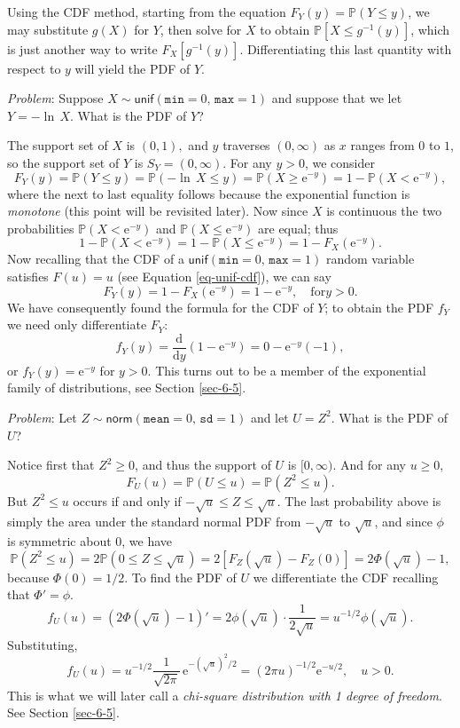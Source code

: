 Using the CDF method, starting from the equation
\(F_{Y}(y)=\mathbb{P}(Y\leq y)\), we may substitute \(g(X)\) for
\(Y\), then solve for \(X\) to obtain \(\mathbb{P}[X\leq g^{-1}(y)]\),
which is just another way to write
\(F_{X}[g^{-1}(y)]\). Differentiating this last quantity with respect
to \(y\) will yield the PDF of \(Y\).


\emph{Problem}:
Suppose \(X\sim\mathsf{unif}(\mathtt{min}=0,\,\mathtt{max}=1)\) and
suppose that we let \(Y=-\ln\, X\). What is the PDF of \(Y\)?

The support set of \(X\) is \((0,1),\) and \(y\) traverses
\((0,\infty)\) as \(x\) ranges from \(0\) to \(1\), so the support set
of \(Y\) is \(S_{Y}=(0,\infty)\). For any \(y>0\), we consider \[
F_{Y}(y)=\mathbb{P}(Y\leq y)=\mathbb{P}(-\ln\, X\leq
y)=\mathbb{P}(X\geq\mathrm{e}^{-y})=1-\mathbb{P}(X<\mathrm{e}^{-y}),
\] where the next to last equality follows because the exponential
function is \emph{monotone} (this point will be revisited later). Now since
\(X\) is continuous the two probabilities
\(\mathbb{P}(X<\mathrm{e}^{-y})\) and
\(\mathbb{P}(X\leq\mathrm{e}^{-y})\) are equal; thus \[ 1-\mathbb{P}(X
<
\mathrm{e}^{-y})=1-\mathbb{P}(X\leq\mathrm{e}^{-y})=1-F_{X}(\mathrm{e}^{-y}).
\] Now recalling that the CDF of a
\(\mathsf{unif}(\mathtt{min}=0,\,\mathtt{max}=1)\) random variable
satisfies \(F(u)=u\) (see Equation \eqref{eq-unif-cdf}), we can say \[
F_{Y}(y)=1-F_{X}(\mathrm{e}^{-y})=1-\mathrm{e}^{-y},\quad \mbox{for
}y>0.  \] We have consequently found the formula for the CDF of \(Y\);
to obtain the PDF \(f_{Y}\) we need only differentiate \(F_{Y}\): \[
f_{Y}(y)=\frac{\mathrm{d}}{\mathrm{d}
y}\left(1-\mathrm{e}^{-y}\right)=0-\mathrm{e}^{-y}(-1), \] or
\(f_{Y}(y)=\mathrm{e}^{-y}\) for \(y>0\). This turns out to be a
member of the exponential family of distributions, see Section
\ref{sec-6-5}.

\emph{Problem}:
\label{exa-distn-of-z-squared} Let
\(Z\sim\mathsf{norm}(\mathtt{mean}=0,\,\mathtt{sd}=1)\) and let
\(U=Z^{2}\).
What is the PDF of \(U\)?

Notice first that
\(Z^{2}\geq0\), and thus the support of \(U\) is \([0,\infty)\). And
for any \(u\geq0\), \[ F_{U}(u)=\mathbb{P}(U\leq
u)=\mathbb{P}(Z^{2}\leq u).  \] But \(Z^{2}\leq u\) occurs if and only
if \(-\sqrt{u}\leq Z\leq\sqrt{u}\). The last probability above is
simply the area under the standard normal PDF from \(-\sqrt{u}\) to
\(\sqrt{u}\), and since \(\phi\) is symmetric about 0, we have \[
\mathbb{P}(Z^{2}\leq u)=2\mathbb{P}(0\leq
Z\leq\sqrt{u})=2\left[F_{Z}(\sqrt{u})-F_{Z}(0)\right]=2\Phi(\sqrt{u})-1,
\] because \(\Phi(0)=1/2\). To find the PDF of \(U\) we differentiate
the CDF recalling that \(\Phi'= \phi\).  \[
f_{U}(u)=\left(2\Phi(\sqrt{u})-1\right)'=2\phi(\sqrt{u})\cdot\frac{1}{2\sqrt{u}}=u^{-1/2}\phi(\sqrt{u}).
\] Substituting, \[ f_{U}(u) =
u^{-1/2}\frac{1}{\sqrt{2\pi}}\,\mathrm{e}^{-(\sqrt{u})^{2}/2}=(2\pi
u)^{-1/2}\mathrm{e}^{-u/2},\quad u > 0.  \] This is what we will later
call a \emph{chi-square distribution with 1 degree of freedom}. See Section
\ref{sec-6-5}.


